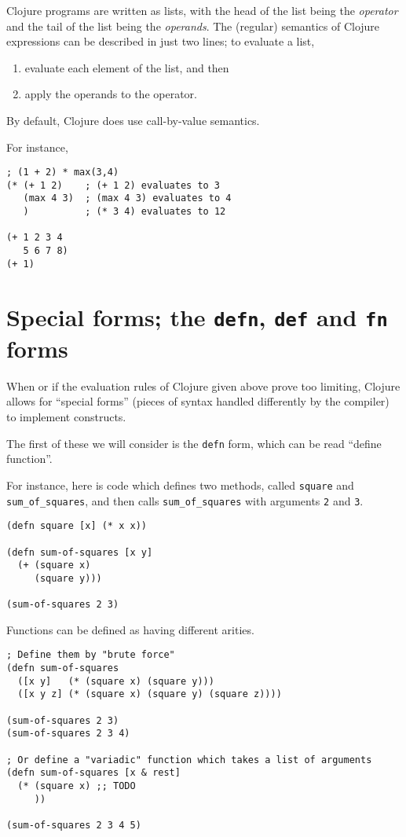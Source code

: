 \documentclass[11pt]{article}
\begin{document}
Clojure programs are written as lists,
with the head of the list being the \emph{operator} and
the tail of the list being the \emph{operands}.
The (regular) semantics of Clojure expressions
can be described in just two lines;
to evaluate a list,
\begin{enumerate}
\item evaluate each element of the list, and then
\item apply the operands to the operator.
\end{enumerate}
By default, Clojure does use call-by-value semantics.

For instance,
\begin{verbatim}
; (1 + 2) * max(3,4)
(* (+ 1 2)    ; (+ 1 2) evaluates to 3
   (max 4 3)  ; (max 4 3) evaluates to 4
   )          ; (* 3 4) evaluates to 12

(+ 1 2 3 4
   5 6 7 8)
(+ 1)
\end{verbatim}

\section{Special forms; the \texttt{defn}, \texttt{def} and \texttt{fn} forms}
\label{sec:orgfca6343}
When or if the evaluation rules of Clojure given above
prove too limiting, Clojure allows for “special forms”
(pieces of syntax handled differently by the compiler)
to implement constructs.

The first of these we will consider is the \texttt{defn} form,
which can be read “define function”.

For instance, here is code which defines two methods,
called \texttt{square} and \texttt{sum\_of\_squares},
and then calls \texttt{sum\_of\_squares} with arguments \texttt{2} and \texttt{3}.
\begin{verbatim}
(defn square [x] (* x x))

(defn sum-of-squares [x y]
  (+ (square x)
     (square y)))

(sum-of-squares 2 3)
\end{verbatim}

Functions can be defined as having different arities.
\begin{verbatim}
; Define them by "brute force" 
(defn sum-of-squares
  ([x y]   (* (square x) (square y)))
  ([x y z] (* (square x) (square y) (square z))))

(sum-of-squares 2 3)
(sum-of-squares 2 3 4)

; Or define a "variadic" function which takes a list of arguments
(defn sum-of-squares [x & rest]
  (* (square x) ;; TODO
     ))

(sum-of-squares 2 3 4 5)
\end{verbatim}
\end{document}
